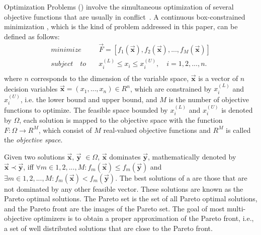  Optimization Problems (\MOPS{}) %
%
involve the simultaneous optimization of several objective functions that are usually in conflict~\cite{Joel:Kalyanmoy}. 
%
A continuous box-constrained minimization \MOP{}, which is the kind of problem addressed in this paper, can be defined as follows:
\begin{equation}
   \begin{split}
    minimize \quad & \vec{F} = [f_1(\vec{\mathbf{x}}), f_2(\vec{\mathbf{x}}), ..., f_M(\vec{\mathbf{x}})] \\
   subject \quad to \quad &  x_i^{(L)} \leq x_i \leq x_i^{(U)}, \quad i=1,2,..., n. \\
   \end{split}
\end{equation}
where $n$ corresponds to the dimension of the variable space, $\vec{\mathbf{x}}$ is a vector of $n$ 
decision variables $\vec{\mathbf{x}}=(x_1, ..., x_n) \in R^n$, which are constrained by $x_i^{(L)}$ 
and $x_i^{(U)}$, i.e. the lower bound and upper bound, and $M$ is the number of objective functions
to optimize.
%
The feasible space bounded by $x_i^{(L)}$ and $x_i^{(U)}$ is denoted by $\Omega$,
each solution is mapped to the objective space with the function $F : \Omega \rightarrow R^M$, 
which consist of $M$ real-valued objective functions and $R^M$ is called the \textit{objective space}. 

Given two solutions $\vec{\mathbf{x}}$, $\vec{\mathbf{y}}$ $\in \Omega$, $\vec{\mathbf{x}}$ dominates $\vec{\mathbf{y}}$, 
mathematically denoted by $\vec{\mathbf{x}} \prec \vec{\mathbf{y}}$, iff $\forall m \in {1,2,...,M} : 
f_m(\vec{\mathbf{x}}) \leq f_m(\vec{\mathbf{y}})$ and $\exists  m \in {1,2,...,M} : f_m(\vec{\mathbf{x}}) < f_m(\vec{\mathbf{y}})$.
%
The best solutions of a \MOP{} are those that are not dominated by any other feasible vector.
%
These solutions are known as the Pareto optimal solutions.
%
The Pareto set is the set of all Pareto optimal solutions, and the Pareto front are the images of the Pareto set. 
%
The goal of most multi-objective optimizers is to obtain a proper approximation of the Pareto front, i.e., 
a set of well distributed solutions that are close to the Pareto front.

